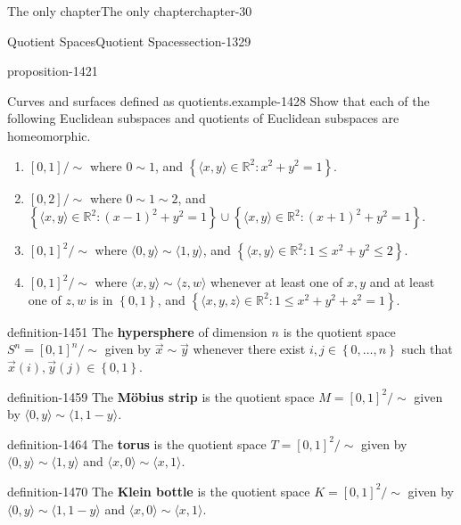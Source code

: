\documentclass[oneside,10pt,]{book}
\newcommand{\terminology}[1]{\textbf{#1}}
\newcommand{\tuple}[1]{\langle #1 \rangle}
\newcommand{\mb}{\mathbb}
\newcommand{\setBuilder}[2]{\left\{#1:#2\right\}}
\newcommand{\setList}[1]{\left\{#1\right\}}
\begin{document}
\begin{chapterptx}{The only chapter}{}{The only chapter}{}{}{chapter-30}
\begin{sectionptx}{Quotient Spaces}{}{Quotient Spaces}{}{}{section-1329}
\begin{proposition}{}{}{proposition-1421}
\end{proposition}
\begin{example}{Curves and surfaces defined as quotients.}{example-1428}%
\hypertarget{p-1430}{}%
Show that each of the following Euclidean subspaces and quotients of Euclidean subspaces are homeomorphic.%
\leavevmode%
\begin{enumerate}
\item\hypertarget{li-1432}{}\([0,1]/\sim\) where \(0\sim 1\), and \(\setBuilder{\tuple{x,y}\in\mb R^2}{x^2+y^2=1}\).%
\item\hypertarget{li-1436}{}\([0,2]/\sim\) where \(0\sim 1\sim 2\), and \(\setBuilder{\tuple{x,y}\in\mb R^2}{(x-1)^2+y^2=1}\cup\setBuilder{\tuple{x,y}\in\mb R^2}{(x+1)^2+y^2=1}\).%
\item\hypertarget{li-1440}{}\([0,1]^2/\sim\) where \(\tuple{0,y}\sim\tuple{1,y}\), and \(\setBuilder{\tuple{x,y}\in\mb R^2}{1\leq x^2+y^2\leq 2}\).%
\item\hypertarget{li-1444}{}\([0,1]^2/\sim\) where \(\tuple{x,y}\sim\tuple{z,w}\) whenever at least one of \(x,y\) and at least one of \(z,w\) is in \(\setList{0,1}\), and \(\setBuilder{\tuple{x,y,z}\in\mb R^2}{1\leq x^2+y^2+z^2=1}\).%
\end{enumerate}
\end{example}
\begin{definition}{}{definition-1451}%
\hypertarget{p-1452}{}%
The \terminology{hypersphere} of dimension \(n\) is the quotient space \(S^n=[0,1]^n/\sim\) given by \(\vec x\sim\vec y\) whenever there exist \(i,j\in\setList{0,\dots,n}\) such that \(\vec x(i),\vec y(j)\in\setList{0,1}\).%
\end{definition}
\begin{definition}{}{definition-1459}%
\hypertarget{p-1460}{}%
The \terminology{Möbius strip} is the quotient space \(M=[0,1]^2/\sim\) given by \(\tuple{0,y}\sim\tuple{1,1-y}\).%
\end{definition}
\begin{definition}{}{definition-1464}%
\hypertarget{p-1465}{}%
The \terminology{torus} is the quotient space \(T=[0,1]^2/\sim\) given by \(\tuple{0,y}\sim\tuple{1,y}\) and \(\tuple{x,0}\sim\tuple{x,1}\).%
\end{definition}
\begin{definition}{}{definition-1470}%
\hypertarget{p-1471}{}%
The \terminology{Klein bottle} is the quotient space \(K=[0,1]^2/\sim\) given by \(\tuple{0,y}\sim\tuple{1,1-y}\) and \(\tuple{x,0}\sim\tuple{x,1}\).%
\end{definition}
\end{sectionptx}
\end{chapterptx}
\end{document}
